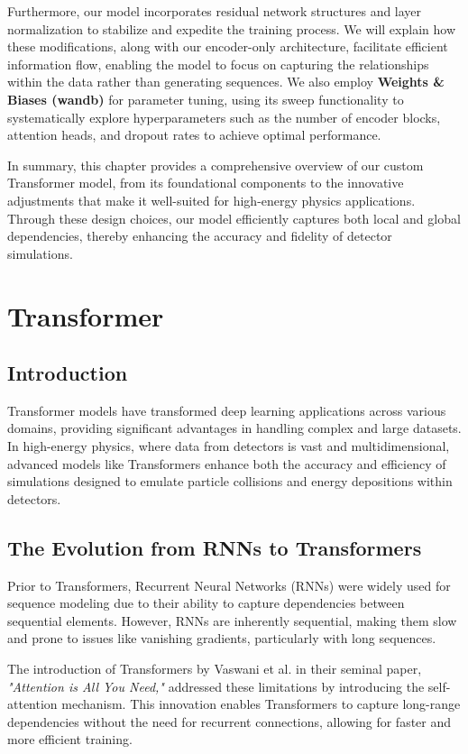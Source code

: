 Furthermore, our model incorporates residual network structures and layer normalization to stabilize and expedite the training process. We will explain how these modifications, along with our encoder-only architecture, facilitate efficient information flow, enabling the model to focus on capturing the relationships within the data rather than generating sequences. We also employ \textbf{Weights \& Biases (wandb)} for parameter tuning, using its sweep functionality to systematically explore hyperparameters such as the number of encoder blocks, attention heads, and dropout rates to achieve optimal performance.

In summary, this chapter provides a comprehensive overview of our custom Transformer model, from its foundational components to the innovative adjustments that make it well-suited for high-energy physics applications. Through these design choices, our model efficiently captures both local and global dependencies, thereby enhancing the accuracy and fidelity of detector simulations.

\section{Transformer}

\subsection{Introduction}
Transformer models have transformed deep learning applications across various domains, providing significant advantages in handling complex and large datasets. In high-energy physics, where data from detectors is vast and multidimensional, advanced models like Transformers enhance both the accuracy and efficiency of simulations designed to emulate particle collisions and energy depositions within detectors.

\subsection{The Evolution from RNNs to Transformers}
Prior to Transformers, Recurrent Neural Networks (RNNs) were widely used for sequence modeling due to their ability to capture dependencies between sequential elements. However, RNNs are inherently sequential, making them slow and prone to issues like vanishing gradients, particularly with long sequences.

The introduction of Transformers by Vaswani et al. in their seminal paper, \textit{"Attention is All You Need,"} addressed these limitations by introducing the self-attention mechanism. This innovation enables Transformers to capture long-range dependencies without the need for recurrent connections, allowing for faster and more efficient training.

